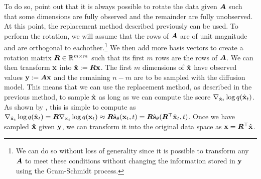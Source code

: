 To do so, \citet{song2020score} point out that it is always possible to rotate the data given ${\bm{A}}$ such that some dimensions are fully observed and the remainder are fully unobserved. At this point, the replacement method described previously can be used. To perform the rotation, we will assume that the rows of ${\bm{A}}$ are of unit magnitude and are orthogonal to eachother.\footnote{We can do so without loss of generality since it is possible to transform any ${\bm{A}}$ to meet these conditions without changing the information stored in ${\mathbf{y}}$ using the Gram-Schmidt process.} We then add more basis vectors to create a rotation matrix ${\bm{R}} \in \mathbb{R}^{m \times m}$ such that its first $m$ rows are the rows of ${\bm{A}}$. We can then transform ${\mathbf{x}}$ into $\hat{{\mathbf{x}}} := {\bm{R}} {\mathbf{x}}$. The first $m$ dimensions of $\hat{{\mathbf{x}}}$ have observed values ${\mathbf{y}} := {\bm{A}}{\mathbf{x}}$ and the remaining $n-m$ are to be sampled with the diffusion model. This means that we can use the replacement method, as described in the previous method, to sample $\hat{{\mathbf{x}}}$ as long as we can compute the score $\nabla_{\hat{{\mathbf{x}}}_t} \log q(\hat{{\mathbf{x}}}_t)$. As shown by \citet{song2020score}, this is simple to compute as $\nabla_{\hat{{\mathbf{x}}}_t} \log q(\hat{{\mathbf{x}}}_t) = {\bm{R}} \nabla_{{\mathbf{x}}_t} \log q({\mathbf{x}}_t) \approx {\bm{R}} \hat{{\mathbf{s}}}_\theta({\mathbf{x}}_t, t) = {\bm{R}} \hat{{\mathbf{s}}}_\theta({\bm{R}}^\top \hat{{\mathbf{x}}}_t, t)$. Once we have sampled $\hat{{\mathbf{x}}}$ given ${\mathbf{y}}$, we can transform it into the original data space as ${\mathbf{x}} = {\bm{R}}^\top \hat{{\mathbf{x}}}$.

